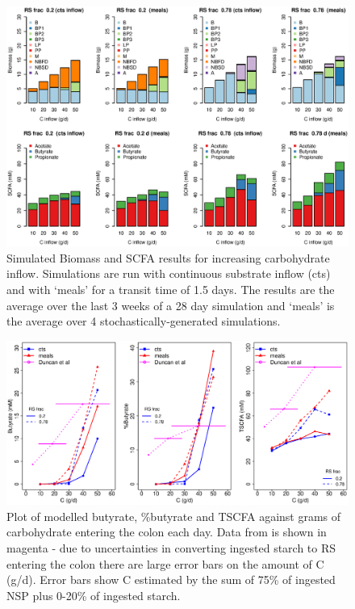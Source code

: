 \documentclass[a4paper]{article}
\begin{document}
\begin{figure}
    \centering
    \includegraphics[scale=0.4]{images/modelledDuncanExpt.eps}
    \caption{Simulated Biomass and SCFA results for increasing carbohydrate inflow. Simulations are run with continuous substrate inflow (cts) and with `meals' for a transit time of 1.5 days. The results are the average over the last 3 weeks of a 28 day simulation and `meals' is the average over 4 stochastically-generated simulations. 
    }
    \label{fig:resultsDunc}
\end{figure}

\begin{figure}
    \centering
    \includegraphics[scale=0.3]{images/ButyrateCProteinExpt.eps}
    \caption{Plot of modelled butyrate, \%butyrate and TSCFA against grams of carbohydrate entering the colon each day. Data from \cite{duncan} is shown in magenta - due to uncertainties in converting ingested starch to RS entering the colon there are large error bars on the amount of C (g/d). Error bars show C estimated by the sum of 75\% of ingested NSP plus 0-20\% of ingested starch.
    }
    \label{fig:ButyrateVsCforPexpt}
\end{figure}
\end{document}
